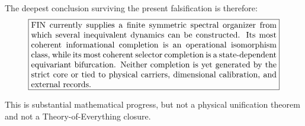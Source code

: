 \documentclass[11pt,a4paper]{article}
\begin{document}
The deepest conclusion surviving the present falsification is therefore:
\[
\boxed{
\begin{minipage}{0.86\textwidth}
FIN currently supplies a finite symmetric spectral organizer from which several inequivalent dynamics can be constructed. Its most coherent informational completion is an operational isomorphism class, while its most coherent selector completion is a state-dependent equivariant bifurcation. Neither completion is yet generated by the strict core or tied to physical carriers, dimensional calibration, and external records.
\end{minipage}}
\]

This is substantial mathematical progress, but not a physical unification theorem and not a Theory-of-Everything closure.
\end{document}
